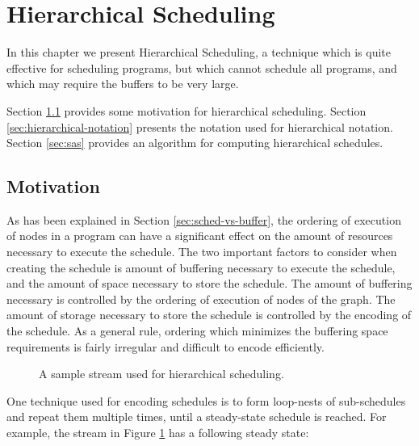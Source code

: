 \section{Hierarchical Scheduling}
\label{chpt:hierarchical}

In this chapter we present Hierarchical Scheduling, a technique
which is quite effective for scheduling {\StreamIt} programs, but
which cannot schedule all programs, and which may require the
buffers to be very large.

Section \ref{sec:hierarchical:motivation} provides some motivation
for hierarchical scheduling.  Section
\ref{sec:hierarchical-notation} presents the notation used for
hierarchical notation. Section \ref{sec:sas} provides an algorithm
for computing hierarchical schedules.

\subsection{Motivation}
\label{sec:hierarchical:motivation}

As has been explained in Section \ref{sec:sched-vs-buffer}, the
ordering of execution of nodes in a {\StreamIt} program can have a
significant effect on the amount of resources necessary to execute
the schedule.  The two important factors to consider when creating
the schedule is amount of buffering necessary to execute the
schedule, and the amount of space necessary to store the schedule.
The amount of buffering necessary is controlled by the ordering of
execution of nodes of the {\StreamIt} graph.  The amount of storage
necessary to store the schedule is controlled by the encoding of
the schedule.  As a general rule, ordering which minimizes the
buffering space requirements is fairly irregular and difficult to
encode efficiently.

\begin{figure}
\centering {}
\caption[Stream for hierarchical scheduling]{A sample stream used
for hierarchical scheduling.} \label{fig:sample-sj}
\end{figure}

One technique used for encoding schedules is to form loop-nests of
sub-schedules and repeat them multiple times, until a steady-state
schedule is reached.  For example, the stream in Figure
\ref{fig:sample-sj} has a following steady state:

